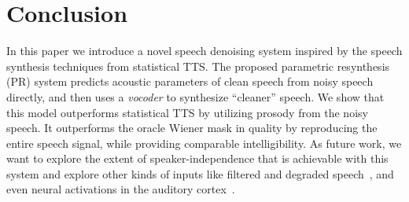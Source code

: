 \documentclass{article}
\begin{document}
\section{Conclusion}
\label{sec:concl}
In this paper we introduce a novel speech denoising system inspired by the speech synthesis techniques from statistical TTS. The proposed  parametric resynthesis (PR) system predicts acoustic parameters of clean speech from noisy speech directly, and then uses a \emph{vocoder} to synthesize ``cleaner'' speech. We show that this model outperforms statistical TTS by utilizing prosody from the noisy speech. It outperforms the oracle Wiener mask in quality by reproducing the entire speech signal, while providing comparable intelligibility. As future work, we want to explore the extent of speaker-independence that is achievable with this system and explore other kinds of inputs like filtered and degraded speech~\cite{mandel15d}, and even neural activations in the auditory cortex~\cite{AkbariReconstructingintelligiblespeech2018}. 




\end{document}
